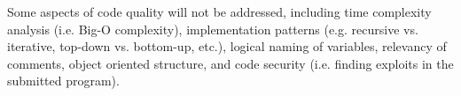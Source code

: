 Some aspects of code quality will not be addressed, including time complexity
analysis (i.e. Big-O complexity), implementation patterns (e.g. recursive vs.
iterative, top-down vs. bottom-up, etc.), logical naming of variables, relevancy of
comments, object oriented structure, and code security (i.e. finding exploits in
the submitted program).
